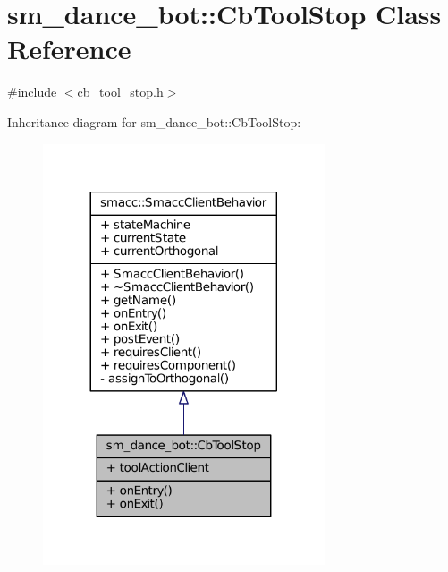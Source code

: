 \hypertarget{classsm__dance__bot_1_1CbToolStop}{}\section{sm\+\_\+dance\+\_\+bot\+:\+:Cb\+Tool\+Stop Class Reference}
\label{classsm__dance__bot_1_1CbToolStop}


{\ttfamily \#include $<$cb\+\_\+tool\+\_\+stop.\+h$>$}



Inheritance diagram for sm\+\_\+dance\+\_\+bot\+:\+:Cb\+Tool\+Stop\+:
\nopagebreak
\begin{figure}[H]
\begin{center}
\leavevmode
\includegraphics[width=236pt]{classsm__dance__bot_1_1CbToolStop__inherit__graph}
\end{center}
\end{figure}


